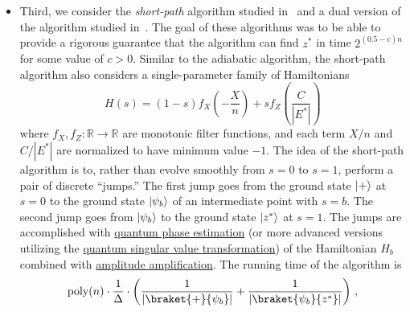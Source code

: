 \begin{refsection}
\begin{itemize}
%
\item Third, we consider the \emph{short-path} algorithm studied in~\cite{hastings2018ShortPathQuantum, hastings2018weaker,hastings2019shortPathToyModel} and a dual version of the algorithm studied in~\cite{dalzell2022mindthegap}. The goal of these algorithms was to be able to provide a rigorous guarantee that the algorithm can find $z^*$ in time $2^{(0.5-c)n}$ for some value of $c>0$. Similar to the adiabatic algorithm, the  short-path algorithm also considers a single-parameter family of Hamiltonians
\begin{equation}
    H(s) = (1-s) f_X\left(-\frac{X}{n}\right) + s f_Z\left(\frac{C}{|E^*|}\right)\label{eq:short_path}
\end{equation}
where $f_X, f_Z: \mathbb{R} \rightarrow \mathbb{R}$ are monotonic filter functions, and each term $X/n$ and $C/|E^*|$ are normalized to have minimum value $-1$. The idea of the short-path algorithm is to, rather than evolve smoothly from $s=0$ to $s=1$, perform a pair of discrete ``jumps.'' The first jump goes from the ground state $\lvert+\rangle$ at $s=0$ to the ground state $\lvert\psi_b\rangle$ of an intermediate point with $s=b$. The second jump goes from $\lvert\psi_b\rangle$ to the ground state $\lvert z^*\rangle$ at $s=1$. The jumps are accomplished with \hyperref[prim:QPE]{quantum phase estimation} (or more advanced versions utilizing the \hyperref[prim:QSVT]{quantum singular value transformation}) of the Hamiltonian $H_b$ combined with \hyperref[prim:AmpAmp]{amplitude amplification}. The running time of the algorithm is \cite[Theorem 1]{dalzell2022mindthegap}
\begin{equation}\label{eq:short_path_runtime}
    \mathrm{poly}(n) \cdot \frac{1}{\Delta} \cdot \left(\frac{1}{|\braket{+}{\psi_b}|} + \frac{1}{|\braket{\psi_b}{z^*}|}\right)\,,
\end{equation}

\end{itemize}
\end{refsection}
